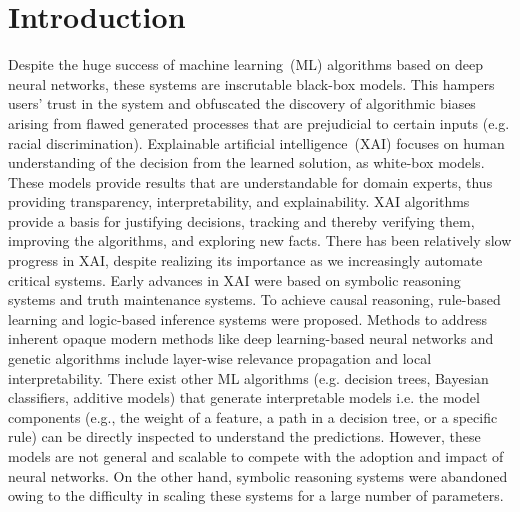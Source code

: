 \documentclass[%
 aps,
 jmp,%
 amsmath,amssymb,
 reprint,%
]{revtex4-2}
\begin{document}
\maketitle

\section{\label{s1}Introduction}


Despite the huge success of machine learning~(ML) algorithms based on deep neural networks, these systems are inscrutable black-box models.
This hampers users' trust in the system and obfuscated the discovery of algorithmic biases arising from flawed generated processes that are prejudicial to certain inputs (e.g. racial discrimination).
Explainable artificial intelligence~(XAI) focuses on human understanding of the decision from the learned solution, as white-box models.
These models provide results that are understandable for domain experts, thus providing transparency, interpretability, and explainability.
XAI algorithms provide a basis for justifying decisions, tracking and thereby verifying them, improving the algorithms, and exploring new facts.
There has been relatively slow progress in XAI, despite realizing its importance as we increasingly automate critical systems.
Early advances in XAI were based on symbolic reasoning systems and truth maintenance systems.
To achieve causal reasoning, rule-based learning and logic-based inference systems were proposed.
Methods to address inherent opaque modern methods like deep learning-based neural networks and genetic algorithms include layer-wise relevance propagation and local interpretability.
There exist other ML algorithms (e.g. decision trees, Bayesian classifiers, additive models) that generate interpretable models i.e. the model components (e.g., the weight of a feature, a path in a decision tree, or a specific rule) can be directly inspected to understand the predictions.
However, these models are not general and scalable to compete with the adoption and impact of neural networks.
On the other hand, symbolic reasoning systems were abandoned owing to the difficulty in scaling these systems for a large number of parameters.
\end{document}
